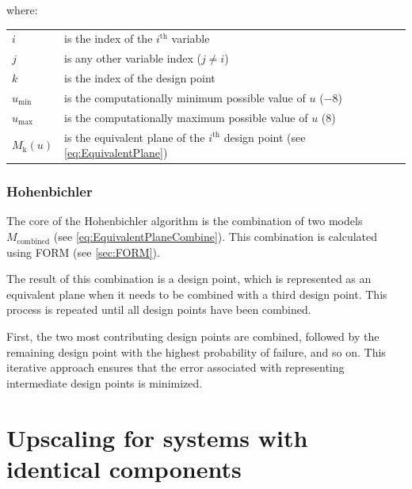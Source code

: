 {where:
\begin{longtable*}{p{20mm}p{\textwidth-24pt-20mm}}  
	$i$ & is the index of the $i^{\text{th}}$ variable \\
	$j$ & is any other variable index ($j \neq i$) \\
	$k$ & is the index of the design point \\
	$u_{\text{min}}$ & is the computationally minimum possible value of $u$ ($-8$) \\
	$u_{\text{max}}$ & is the computationally maximum possible value of $u$ ($8$) \\
	$M_{\text{k}}\left(u\right)$ & is the equivalent plane of the $i^{\text{th}}$ design point (see \autoref{eq:EquivalentPlane})
\end{longtable*}

\subsubsection{Hohenbichler}\label{sec:Hohenbichler}

The core of the Hohenbichler algorithm is the combination of two models $M_{\text{combined}}$ (see \autoref{eq:EquivalentPlaneCombine}).
This combination is calculated using FORM (see \autoref{sec:FORM}).

The result of this combination is a design point, which is represented as an equivalent plane when it needs to be combined with a third design point. This process is repeated until all design points have been combined. 

First, the two most contributing design points are combined, followed by the remaining design point with the highest probability of failure, and so on. This iterative approach ensures that the error associated with representing intermediate design points is minimized.

\section{Upscaling for systems with identical components}\label{sec:upscaling}

}

